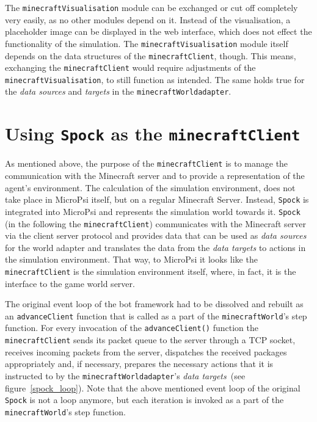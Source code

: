 The \texttt{minecraftVisualisation} module can be exchanged or cut off completely very easily, as no other modules depend on it. Instead of the visualisation, a placeholder image can be displayed in the web interface, which does not effect the functionality of the simulation. The \texttt{minecraftVisualisation} module itself depends on the data structures of the \texttt{minecraftClient}, though. This means, exchanging the \texttt{minecraftClient} would require adjustments of the \texttt{minecraftVisualisation}, to still function as intended. The same holds true for the \emph{data sources} and \emph{targets} in the \texttt{minecraftWorldadapter}.

    \section{Using \texttt{Spock} as the \texttt{minecraftClient}}

As mentioned above, the purpose of the \texttt{minecraftClient} is to manage the communication with the Minecraft server and to provide a representation of the agent's environment. The calculation of the simulation environment, does not take place in MicroPsi itself, but on a regular Minecraft Server. Instead, \texttt{Spock} is integrated into MicroPsi and represents the simulation world towards it. \texttt{Spock} (in the following the \texttt{minecraftClient}) communicates with the Minecraft server via the client server protocol and provides data that can be used as \emph{data sources} for the world adapter and translates the data from the \emph{data targets} to actions in the simulation environment. That way, to MicroPsi it looks like the \texttt{minecraftClient} is the simulation environment itself, where, in fact, it is the interface to the game world server.


The original event loop of the bot framework had to be dissolved and rebuilt as an \texttt{advanceClient} function that is called as a part of the \texttt{minecraftWorld}'s step function. For every invocation of the \texttt{advanceClient()} function the \texttt{minecraftClient} sends its packet queue to the server through a TCP socket, receives incoming packets from the server, dispatches the received packages appropriately and, if necessary, prepares the necessary actions that it is instructed to by the \texttt{minecraftWorldadapter}'s \emph{data targets}~(see figure~\ref{spock_loop}). Note that the above mentioned event loop of the original \texttt{Spock} is not a loop anymore, but each iteration is invoked as a part of the \texttt{minecraftWorld}'s step function.

